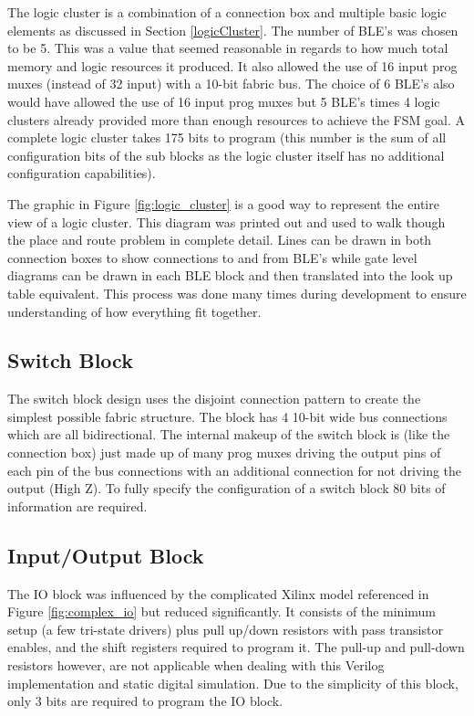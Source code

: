 \documentclass[12pt]{article}
\begin{document}
The logic cluster is a combination of a connection box and multiple basic logic elements
as discussed in Section \ref{logicCluster}. The number of BLE's was chosen to be 5. This
was a value that seemed reasonable in regards to how much total memory and logic resources
 it produced. It also allowed the use of 16 input prog muxes (instead of 32 input) with a
10-bit fabric bus. The choice of 6 BLE's also would have allowed the use of 16 input prog muxes but
5 BLE's times 4 logic clusters already provided more than enough resources to achieve the
FSM goal. A complete logic cluster takes 175 bits to program (this number is the sum of all
configuration bits of the sub blocks as the logic cluster itself has no additional
configuration capabilities).

The graphic in Figure \ref{fig:logic_cluster} is a good way to represent the entire view
of a logic cluster. This diagram was printed out and used to walk though the place and route problem in
complete detail. Lines can be drawn in both connection boxes to show connections to and from BLE's while
gate level diagrams can be drawn in each BLE block and then translated into the look up table
equivalent. This process was done many times during development to ensure understanding of
how everything fit together.

\subsection{Switch Block}

The switch block design uses the disjoint connection pattern to create the simplest
possible fabric structure. The block has 4 10-bit wide bus connections which are all
bidirectional. The internal makeup of the switch block is (like the connection box) just
made up of many prog muxes driving the output pins of each pin of the bus connections with
an additional connection for not driving the output (High Z). To fully specify the configuration
of a switch block 80 bits of information are required.


\subsection{Input/Output Block}

The IO block was influenced by the complicated Xilinx model referenced in Figure
\ref{fig:complex_io} but reduced significantly. It consists of the minimum setup 
(a few tri-state drivers) plus pull up/down resistors with pass transistor 
enables, and the shift registers required to program it. The pull-up and pull-down
resistors however, are not applicable when dealing with this Verilog implementation
and static digital simulation. Due to the simplicity of this block, only 3 bits are
required to program the IO block.
\end{document}
